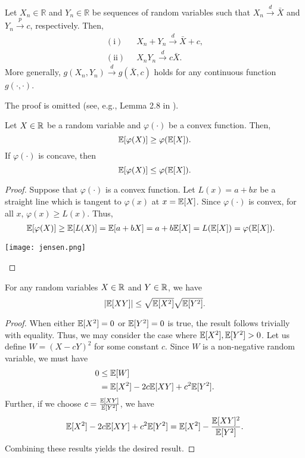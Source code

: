 \documentclass[11pt, A4paper, openany, uplatex]{book}
\begin{document}
\begin{appendices}
\begin{lemma}\label{lem:slutsky}
	Let $X_n \in \mathbb{R}$ and $Y_n \in \mathbb{R}$ be sequences of random variables such that $X_n \overset{d}{\to} \bar X$ and $Y_n \overset{p}{\to} c$, respectively.
	Then,
	\begin{align*}
	\mathrm{(i)} & \;\; X_n + Y_n \overset{d}{\to} \bar X + c,\\
	\mathrm{(ii)} & \;\; X_n Y_n \overset{d}{\to} c \bar X.
	\end{align*}
	More generally, $g(X_n, Y_n) \overset{d}{\to} g(\bar X, c)$ holds for any continuous function $g(\cdot, \cdot)$. 
\end{lemma}
The proof is omitted (see, e.g., Lemma 2.8 in \cite{van2000asymptotic}).

\begin{lemma}\label{lem:Jensen}
	 Let $X \in \mathbb{R}$ be a random variable and $\varphi(\cdot)$ be a convex function.
	 Then,
	\[
		\mathbb{E}[\varphi(X)] \ge \varphi(\mathbb{E}[X]). 
	\]
	If $\varphi(\cdot)$ is concave, then
	\[
		\mathbb{E}[\varphi(X)] \le \varphi(\mathbb{E}[X]). 
	\]
\end{lemma}

\begin{proof}
	Suppose that $\varphi(\cdot)$ is a convex function.
	Let $L(x) = a + bx$ be a straight line which is tangent to $\varphi(x)$ at $x = \mathbb{E}[X]$.
	Since $\varphi(\cdot)$ is convex, for all $x$, $\varphi(x) \ge L(x)$.
	Thus,
	\begin{align*}
	\mathbb{E}[\varphi(X)] 
	& \ge \mathbb{E}[L(X)] = \mathbb{E}[a + bX] = a + b \mathbb{E}[X] = L(\mathbb{E}[X]) =  \varphi(\mathbb{E}[X]).
	\end{align*}
	\begin{center}
		\texttt{[image: jensen.png]}
	\end{center}

\end{proof}

\begin{lemma}\label{lem:CS}
	For any random variables $X \in \mathbb{R}$ and $Y \in \mathbb{R}$, we have
	\[
	\left| \mathbb{E}[XY] \right| \le \sqrt{\mathbb{E}[X^2]} \sqrt{\mathbb{E}[Y^2]}. 
	\]
\end{lemma}

\begin{proof}
	When either $\mathbb{E}[X^2] = 0$ or $\mathbb{E}[Y^2] = 0$ is true, the result follows trivially with equality.
	Thus, we may consider the case where $\mathbb{E}[X^2], \mathbb{E}[Y^2] > 0$.
	Let us define $W = (X - c Y)^2$ for some constant $c$.
	Since $W$ is a non-negative random variable, we must have
	\begin{align*}
		0 
		& \le \mathbb{E}[W] \\
		& = \mathbb{E}[X^2] - 2c\mathbb{E}[XY] + c^2 \mathbb{E}[Y^2].
	\end{align*}
	Further, if we choose $c = \frac{\mathbb{E}[XY]}{\mathbb{E}[Y^2]}$, we have
	\[
	 	\mathbb{E}[X^2] - 2c\mathbb{E}[XY] + c^2 \mathbb{E}[Y^2] = \mathbb{E}[X^2] - \frac{\mathbb{E}[XY]^2}{\mathbb{E}[Y^2]}.
	\]
	Combining these results yields the desired result.
\end{proof}

\end{appendices}
\end{document}
